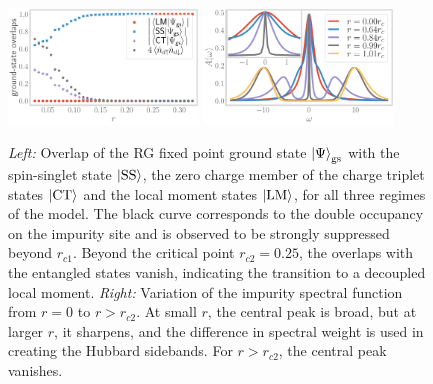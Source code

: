 \documentclass{iopart}
\begin{document}
\begin{figure}[!htb]
	\includegraphics[width=0.45\textwidth]{corrs_gs.pdf}
	\hspace*{\fill}
	\includegraphics[width=0.45\textwidth]{spectral-function.pdf}
	\caption{{\it Left:} Overlap of the RG fixed point ground state \(\ket{\Psi}_\text{gs}\) with the spin-singlet state \(\ket{\text{SS}}\), the zero charge member of the charge triplet states \(\ket{\text{CT}}\) and the local moment states \(\ket{\text{LM}}\), for all three regimes of the model. The black curve corresponds to the double occupancy on the impurity site and is observed to be strongly suppressed beyond $r_{c1}$. Beyond the critical point \(r_{c2} = 0.25\), the overlaps with the entangled states vanish, indicating the transition to a decoupled local moment. {\it Right:} Variation of the impurity spectral function from \(r = 0\) to \(r > r_{c2}\). At small \(r\), the central peak is broad, but at larger \(r\), it sharpens, and the difference in spectral weight is used in creating the Hubbard sidebands. For \(r > r_{c2}\), the central peak vanishes.}
	\label{spec_func}
\end{figure}
\end{document}
